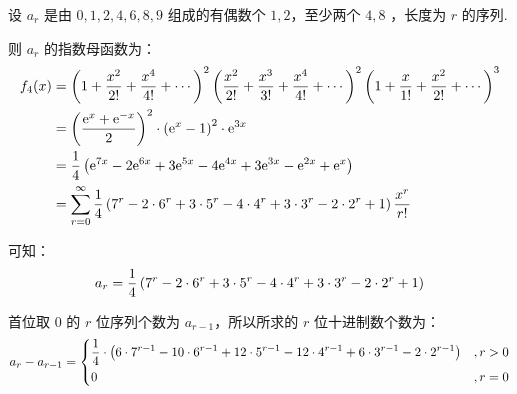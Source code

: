 \documentclass[cn, hazy, blue, normal, 12pt]{elegantnote}
\begin{document}
\begin{solution}[print=true]

    设 $a_r$ 是由 $0, 1, 2, 4, 6, 8, 9$ 组成的有偶数个 $1, 2$，至少两个 $4, 8$ ，长度为 $r$ 的序列.

    则 $a_r$ 的指数母函数为：
    \begin{equation}
        \notag
        \begin{aligned}
            f_4(x)
             & = \left(1+\frac{x^2}{2!}+\frac{x^4}{4!}+\cdots\right)^2
            \left(\frac{x^2}{2!}+\frac{x^3}{3!}+\frac{x^4}{4!}+\cdots\right)^2
            \left(1+\frac{x}{1!}+\frac{x^2}{2!}+\cdots\right)^3                \\
             & = \left(\frac{\mathrm{e}^{x}+\mathrm{e}^{-x}}{2}\right)^2 \cdot
            \left(\mathrm{e}^{x}-1\right)^2 \cdot
            \mathrm{e}^{3x}                                                    \\
             & = \frac{1}{4}\left(
            \mathrm{e}^{7x}-2\mathrm{e}^{6x}+3\mathrm{e}^{5x}-4\mathrm{e}^{4x}+
            3\mathrm{e}^{3x}-\mathrm{e}^{2x}+\mathrm{e}^{x}
            \right)                                                            \\
             & =\sum_{r=0}^{\infty}{\frac{1}{4}\left(
            7^r - 2 \cdot 6^r + 3 \cdot 5^r - 4 \cdot 4^r+
            3 \cdot 3^r- 2 \cdot 2^r + 1
            \right)\frac{x^r}{r!}}
        \end{aligned}
    \end{equation}

    可知：
    \begin{equation}
        \notag
        a_r = \frac{1}{4}\left(
        7^r - 2 \cdot 6^r + 3 \cdot 5^r - 4 \cdot 4^r+
        3 \cdot 3^r- 2 \cdot 2^r + 1
        \right)
    \end{equation}

    首位取 $0$ 的 $r$ 位序列个数为 $a_{r-1}$，所以所求的 $r$ 位十进制数个数为：
    \begin{equation}
        \notag
        a_r - a_{r-1} = \left\{
        \begin{aligned}
             & \frac{1}{4} \cdot \left(
            6 \cdot 7^{r-1} - 10 \cdot 6^{r-1} +
            12 \cdot 5^{r-1} - 12 \cdot 4^{r-1} +
            6 \cdot 3^{r-1} - 2 \cdot 2^{r-1}
            \right)
             & , r>0                    \\
             & 0
             & , r=0
        \end{aligned}
        \right.
    \end{equation}

\end{solution}
\end{document}
